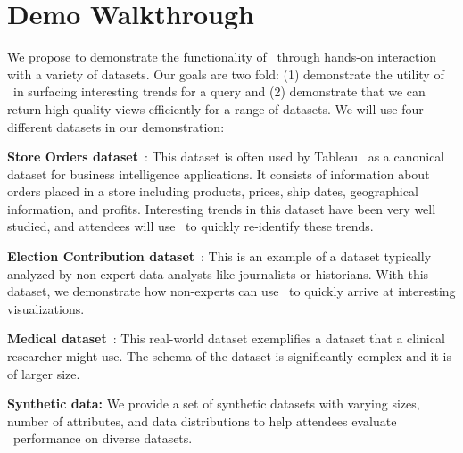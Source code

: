 \vspace{-2mm}
\section{Demo Walkthrough}
\label{sec:demo-walkthrough}
 
We propose to demonstrate the functionality of \VizRecDB\ through hands-on
interaction with a variety of datasets. Our goals are two fold: (1) demonstrate
the utility of \VizRecDB\ in surfacing interesting trends for a query
and (2) demonstrate that we can return high quality views efficiently for
a range of datasets. We will use four different datasets in our demonstration:

\begin{denselist}
  \item {\bf Store Orders dataset}~\cite{superstore}: This dataset is
    often used by Tableau~\cite{tableau} as a canonical dataset for
    business intelligence applications. It consists of information
    about orders placed in a store including products, prices, ship
    dates, geographical information, and profits. Interesting trends in
    this dataset have been very well studied, and attendees will use
    \VizRecDB\ to quickly re-identify these trends. 
  \item {\bf Election Contribution dataset}~\cite{election_data}: This
  is an example of a dataset typically analyzed by
    non-expert data analysts like journalists or historians. With this
    dataset, we demonstrate how non-experts can use \VizRecDB\ to quickly
    arrive at interesting visualizations.
  \item {\bf Medical dataset}~\cite{mimic}: This real-world dataset exemplifies
  a dataset that a clinical researcher might use. The schema of the dataset is
  significantly complex and it is of larger size.  
    \item {\bf Synthetic data:} We provide a set of synthetic datasets with
    varying sizes, number of attributes, and data distributions to help
    attendees evaluate \VizRecDB\ performance on diverse datasets.
\end{denselist}

